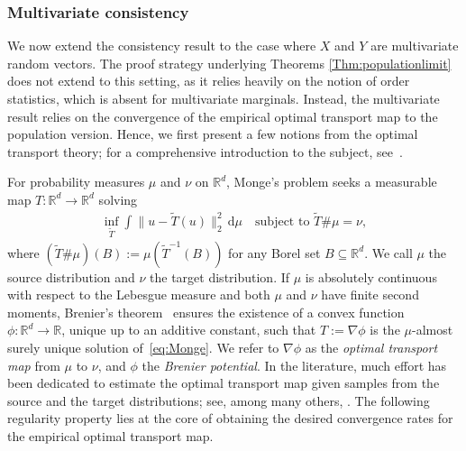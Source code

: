 \documentclass[11pt]{article}
\begin{document}
\subsubsection{Multivariate consistency}
We now extend the consistency result to the case where $X$ and $Y$ are multivariate random vectors. The proof strategy underlying Theorems \ref{Thm:populationlimit} does not extend to this setting, as it relies heavily on the notion of order statistics, which is absent for multivariate marginals. Instead, the multivariate result relies on the convergence of the empirical optimal transport map to the population version. Hence, we first present a few notions from the optimal transport theory; for a comprehensive introduction to the subject, see~\citet{villani2009optimal, villani2021topics}. 

For probability measures $\mu$ and $\nu$ on $\mathbb{R}^d$, Monge's problem \citep{monge1781memoire} seeks a measurable map $T : \mathbb{R}^d \to \mathbb{R}^d$ solving
\begin{align}
\inf_{\tilde T} \int\|u- {\tilde T}(u)\|_2^2 \, \mathrm{d} \mu \quad \text{subject to $\tilde T{\#} \mu=\nu$}, \label{eq:Monge}
\end{align}
where $(\tilde T\#\mu) (B) := \mu (\tilde T^{-1}(B))$ for any Borel set $B \subseteq \mathbb{R}^d$. We call $\mu$ the source distribution and $\nu$ the target distribution. If $\mu$ is absolutely continuous with respect to the Lebesgue measure and both $\mu$ and $\nu$ have finite second moments, Brenier's theorem~\citep{brenier1991polar} ensures the existence of a convex function $\phi : \mathbb{R}^d \to \mathbb{R}$, unique up to an additive constant, such that $T:=\nabla\phi$ is the $\mu$-almost surely unique solution of~\eqref{eq:Monge}. We refer to $\nabla\phi$ as the \emph{optimal transport map} from $\mu$ to $\nu$, and $\phi$ the \emph{Brenier potential}. In the literature, much effort has been dedicated to estimate the optimal transport map given samples from the source and the target distributions; see, among many others, \cite{hutter2021minimax, Deb2021RatesOE, divol2025optimal, manole2024plugin, balakrishnan2025stability}. The following regularity property lies at the core of obtaining the desired convergence rates for the empirical optimal transport map.

\end{document}
